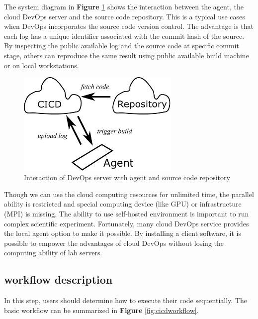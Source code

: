\documentclass{IEEEcsmag}
\begin{document}
The system diagram in \textbf{Figure} \ref{fig:principal} shows the interaction between the agent, the cloud DevOps server and the source code repository. 
This is a typical use cases when DevOps incorporates the source code version control. The advantage is that each log has a unique identifier associated with the commit hash of the source. By inspecting the public available log and the source code at specific commit stage, others can reproduce the same result using public available build machine or on local workstations.

\begin{figure}[!ht]
\centerline{\includegraphics[width=18.5pc]{principal.pdf}}
\caption{Interaction of DevOps server with agent and source code repository}\label{fig:principal}
\end{figure}

Though we can use the cloud computing resources for unlimited time, the parallel ability is restricted and special computing device (like GPU) or infrastructure (MPI) is missing. The ability to use self-hosted environment is important to run complex scientific experiment. Fortunately, many cloud DevOps service provides the local agent option to make it possible. By installing a client software, it is possible to empower the advantages of cloud DevOps without losing the computing ability of lab servers. 
\subsection{workflow description}
In this step, users should determine how to execute their code sequentially. The basic workflow can be summarized in \textbf{Figure} \ref{fig:cicdworkflow}.
\end{document}

